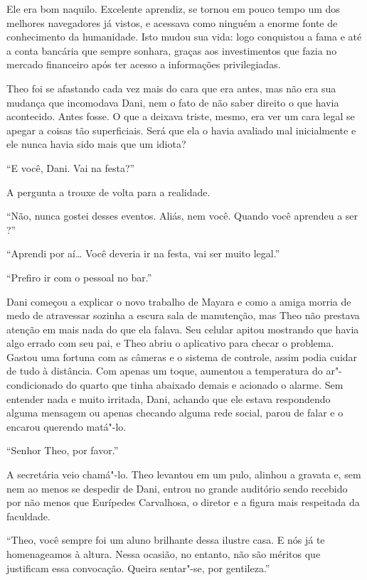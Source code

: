 Ele era bom naquilo. Excelente aprendiz, se tornou em pouco tempo um dos melhores
navegadores já vistos, e acessava como ninguém
a enorme fonte de conhecimento da humanidade. Isto mudou sua vida: logo
conquistou a fama e até a conta bancária que sempre sonhara,
graças aos investimentos que fazia no mercado financeiro após ter
acesso a informações privilegiadas.

Theo foi se afastando cada vez mais do cara que era antes, mas não era
sua mudança que incomodava Dani, nem o fato de não saber direito o que
havia acontecido. Antes fosse. O que a deixava triste, mesmo, era ver um
cara legal se apegar a coisas tão superficiais. Será que ela o havia
avaliado mal inicialmente e ele nunca havia sido mais que um idiota?

``E você, Dani. Vai na festa?''

A pergunta a trouxe de volta para a realidade.

``Não, nunca gostei desses eventos. Aliás, nem você. Quando você
aprendeu a ser ?''

``Aprendi por aí\ldots{} Você deveria ir na festa, vai ser muito
legal.''

``Prefiro ir com o pessoal no bar.''

Dani começou a explicar o novo trabalho de Mayara e como a amiga morria
de medo de atravessar sozinha a escura sala de manutenção, mas Theo não
prestava atenção em mais nada do que ela falava. Seu celular apitou
mostrando que havia algo errado com seu pai, e Theo abriu o aplicativo
para checar o problema. Gastou uma fortuna com as câmeras e o sistema de
controle, assim podia cuidar de tudo à distância. Com apenas um
toque, aumentou a temperatura do ar"-condicionado do quarto que tinha
abaixado demais e acionado o alarme. Sem entender nada e muito irritada,
Dani, achando que ele estava respondendo alguma mensagem ou apenas
checando alguma rede social, parou de falar e o encarou querendo
matá"-lo.

``Senhor Theo, por favor.''

A secretária veio chamá"-lo. Theo levantou em um pulo, alinhou a gravata
e, sem nem ao menos se despedir de Dani, entrou no grande auditório
sendo recebido por não menos que Eurípedes Carvalhosa, o diretor e a
figura mais respeitada da faculdade.

``Theo, você sempre foi um aluno brilhante dessa ilustre casa. E nós já
te homenageamos à altura. Nessa ocasião, no entanto, não são méritos que
justificam essa convocação. Queira sentar"-se, por gentileza.''

